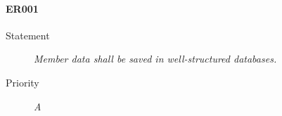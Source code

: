 \paragraph{ER001}
  \begin{description}
  \item [Statement] 
    \textit{ Member data shall be saved in well-structured databases.}
  \item [Priority] \textit{A}
\end{description}

